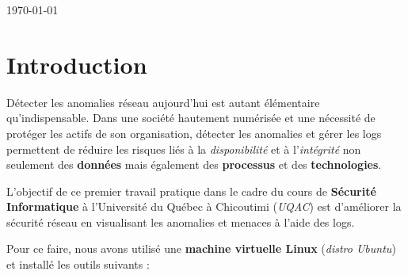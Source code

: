 \documentclass[12pt]{article}
\begin{document}
\begin{titlepage}
	
	
	\vfill\vfill\vfill\vfill %
	
	{\large\today} %
	
	
\end{titlepage}	
	

\vspace*{0.25cm}



\tableofcontents

\newpage

\listoffigures
\newpage

\section{Introduction}\label{sec:Q1}

Détecter les anomalies réseau aujourd'hui est autant élémentaire qu'indispensable. Dans une société hautement numérisée et une nécessité de protéger les actifs de son organisation, détecter les anomalies et gérer les logs permettent de réduire les risques liés à la \textit{disponibilité} et à l'\textit{intégrité} non seulement des \textbf{données} mais également des \textbf{processus} et des \textbf{technologies}.

\vspace{0.4cm}

L'objectif de ce premier travail pratique dans le cadre du cours de \textbf{Sécurité Informatique} à l'Université du Québec à Chicoutimi (\textit{UQAC}) est d'améliorer la sécurité réseau en visualisant les anomalies et menaces à l'aide des logs.

\vspace{0.4cm}

Pour ce faire, nous avons utilisé une \textbf{machine virtuelle Linux} (\textit{distro Ubuntu}) et installé les outils suivants :
\end{document}
